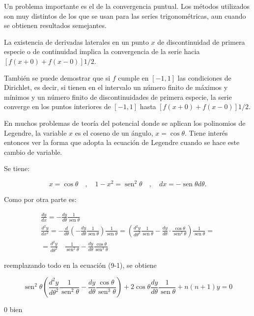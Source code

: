 \documentclass[10pt]{article}
\theoremstyle{plain}
\theoremstyle{definition}
\theoremstyle{remark}
\begin{document}
Un problema importante es el de la convergencia puntual. Los métodos utilizados son muy distintos de los que se usan para las series trigonométricas, aun cuando se obtienen resultados semejantes.

La existencia de derivadas laterales en un punto $x$ de discontinuidad de primera especie o de continuidad implica la convergencia de la serie hacia $[f(x+0)+f(x-0)] 1 / 2$.

También se puede demostrar que si $f$ cumple en $[-1,1]$ las condiciones de Dirichlet, es decir, si tienen en el intervalo un número finito de máximos y mínimos y un número finito de discontinuidades de primera especie, la serie converge en los puntos interiores de $[-1,1]$ hasta $[f(x+0)+f(x-0)] 1 / 2$.

En muchos problemas de teoría del potencial donde se aplican los polinomios de Legendre, la variable $x$ es el coseno de un ángulo, $x=\cos \theta$. Tiene interés entonces ver la forma que adopta la ecuación de Legendre cuando se hace este cambio de variable.

Se tiene:

$$
x=\cos \theta \quad, \quad 1-x^{2}=\operatorname{sen}^{2} \theta \quad, \quad d x=-\operatorname{sen} \theta d \theta .
$$

Como por otra parte es:

$$
\begin{gathered}
\frac{d y}{d x}=-\frac{d y}{d \theta} \frac{1}{\operatorname{sen} \theta} \\
\frac{d^{2} y}{d x^{2}}=-\frac{d}{d \theta}\left(-\frac{d y}{d \theta} \frac{1}{\operatorname{sen} \theta}\right) \frac{1}{\operatorname{sen} \theta}=\left(\frac{d^{2} y}{d \theta^{2}} \frac{1}{\operatorname{sen} \theta}-\frac{d y}{d \theta} \cdot \frac{\cos \theta}{\operatorname{sen}^{2} \theta}\right) \frac{1}{\operatorname{sen} \theta}= \\
=\frac{d^{2} y}{d \theta^{2}} \quad \frac{1}{\operatorname{sen}^{2} \theta}-\frac{d y}{d \theta} \frac{\cos \theta}{\operatorname{sen}^{3} \theta}
\end{gathered}
$$

reemplazando todo en la ecuación (9-1), se obtiene

$$
\operatorname{sen}^{2} \theta\left(\frac{d^{2} y}{d \theta^{2}} \frac{1}{\operatorname{sen}^{2} \theta}-\frac{d y}{d \theta} \frac{\cos \theta}{\operatorname{sen}^{3} \theta}\right)+2 \cos \theta \frac{d y}{d \theta} \frac{1}{\operatorname{sen} \theta}+n(n+1) y=0
$$

0 bien
\end{document}
